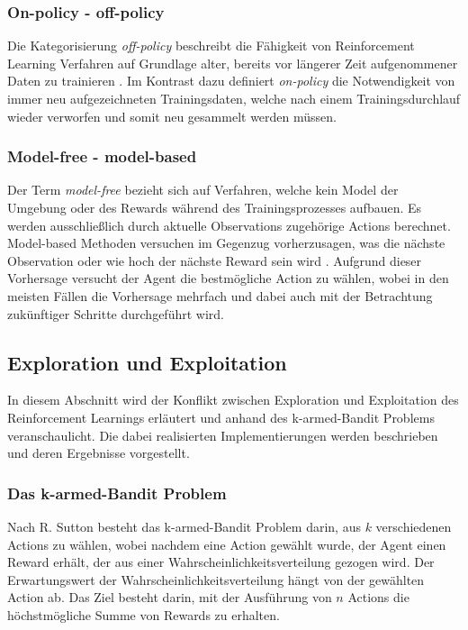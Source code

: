 \documentclass[11pt]{scrartcl}
\begin{document}
\subsubsection{On-policy - off-policy}
Die Kategorisierung \textit{off-policy} beschreibt die Fähigkeit von Reinforcement Learning Verfahren auf
Grundlage alter, bereits vor längerer Zeit aufgenommener Daten zu trainieren \cite[~S.78 f.]{L2018}.
Im Kontrast dazu definiert \textit{on-policy} die Notwendigkeit von immer neu aufgezeichneten 
Trainingsdaten, welche nach einem Trainingsdurchlauf wieder verworfen und somit neu gesammelt
werden müssen.


\subsubsection{Model-free - model-based}
Der Term \textit{model-free} bezieht sich auf Verfahren, welche kein Model der Umgebung oder des Rewards
während des Trainingsprozesses aufbauen. Es werden ausschließlich durch aktuelle Observations
zugehörige Actions berechnet. Model-based Methoden versuchen im Gegenzug vorherzusagen, was 
die nächste Observation oder wie hoch der nächste Reward sein wird \cite[~S.78 f.]{L2018}. Aufgrund dieser
Vorhersage versucht der Agent die bestmögliche Action zu wählen, wobei in den meisten
Fällen die Vorhersage mehrfach und dabei auch mit der Betrachtung zukünftiger Schritte durchgeführt
wird.


\subsection{Exploration und Exploitation}
In diesem Abschnitt wird der Konflikt zwischen Exploration und Exploitation des
Reinforcement Learnings erläutert und anhand des k-armed-Bandit Problems veranschaulicht.
Die dabei realisierten Implementierungen werden beschrieben und deren Ergebnisse
vorgestellt.


\subsubsection{Das k-armed-Bandit Problem}
Nach R. Sutton \cite[~S.26]{SB1998} besteht das k-armed-Bandit Problem darin, aus $k$
verschiedenen Actions zu wählen, wobei nachdem eine Action gewählt wurde, der Agent einen
Reward erhält, der aus einer Wahrscheinlichkeitsverteilung gezogen wird. Der
Erwartungswert der Wahrscheinlichkeitsverteilung hängt von der gewählten Action ab. Das
Ziel besteht darin, mit der Ausführung von $n$ Actions die höchstmögliche Summe von Rewards
zu erhalten.
\end{document}

